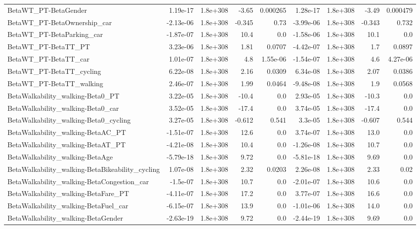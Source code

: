 \begin{tabular}{lrrrrrrrr}
BetaWT_PT-BetaGender & 1.19e-17 & 1.8e+308 & -3.65 & 0.000265 & 1.28e-17 & 1.8e+308 & -3.49 & 0.000479 \\
BetaWT_PT-BetaOwnership_car & -2.13e-06 & 1.8e+308 & -0.345 & 0.73 & -3.99e-06 & 1.8e+308 & -0.343 & 0.732 \\
BetaWT_PT-BetaParking_car & -1.87e-07 & 1.8e+308 & 10.4 & 0.0 & -1.58e-06 & 1.8e+308 & 10.1 & 0.0 \\
BetaWT_PT-BetaTT_PT & 3.23e-06 & 1.8e+308 & 1.81 & 0.0707 & -4.42e-07 & 1.8e+308 & 1.7 & 0.0897 \\
BetaWT_PT-BetaTT_car & 1.01e-07 & 1.8e+308 & 4.8 & 1.55e-06 & -1.54e-07 & 1.8e+308 & 4.6 & 4.27e-06 \\
BetaWT_PT-BetaTT_cycling & 6.22e-08 & 1.8e+308 & 2.16 & 0.0309 & 6.34e-08 & 1.8e+308 & 2.07 & 0.0386 \\
BetaWT_PT-BetaTT_walking & 2.46e-07 & 1.8e+308 & 1.99 & 0.0464 & -9.48e-08 & 1.8e+308 & 1.9 & 0.0568 \\
BetaWalkability_walking-Beta0_PT & 3.22e-05 & 1.8e+308 & -10.4 & 0.0 & 2.93e-05 & 1.8e+308 & -10.3 & 0.0 \\
BetaWalkability_walking-Beta0_car & 3.52e-05 & 1.8e+308 & -17.4 & 0.0 & 3.74e-05 & 1.8e+308 & -17.4 & 0.0 \\
BetaWalkability_walking-Beta0_cycling & 3.27e-05 & 1.8e+308 & -0.612 & 0.541 & 3.3e-05 & 1.8e+308 & -0.607 & 0.544 \\
BetaWalkability_walking-BetaAC_PT & -1.51e-07 & 1.8e+308 & 12.6 & 0.0 & 3.74e-07 & 1.8e+308 & 13.0 & 0.0 \\
BetaWalkability_walking-BetaAT_PT & -4.21e-08 & 1.8e+308 & 10.4 & 0.0 & -1.26e-08 & 1.8e+308 & 10.7 & 0.0 \\
BetaWalkability_walking-BetaAge & -5.79e-18 & 1.8e+308 & 9.72 & 0.0 & -5.81e-18 & 1.8e+308 & 9.69 & 0.0 \\
BetaWalkability_walking-BetaBikeability_cycling & 1.07e-08 & 1.8e+308 & 2.32 & 0.0203 & 2.26e-08 & 1.8e+308 & 2.33 & 0.02 \\
BetaWalkability_walking-BetaCongestion_car & -1.5e-07 & 1.8e+308 & 10.7 & 0.0 & -2.01e-07 & 1.8e+308 & 10.6 & 0.0 \\
BetaWalkability_walking-BetaFare_PT & -4.11e-07 & 1.8e+308 & 17.2 & 0.0 & 3.77e-07 & 1.8e+308 & 16.6 & 0.0 \\
BetaWalkability_walking-BetaFuel_car & -6.15e-07 & 1.8e+308 & 13.9 & 0.0 & -1.01e-06 & 1.8e+308 & 14.0 & 0.0 \\
BetaWalkability_walking-BetaGender & -2.63e-19 & 1.8e+308 & 9.72 & 0.0 & -2.44e-19 & 1.8e+308 & 9.69 & 0.0 \\

\end{tabular}
